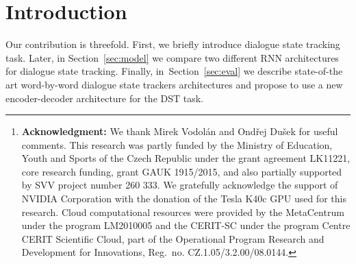 \documentclass{itatnew}
\begin{document}
\begin{abstract}
This paper discusses models for dialogue state tracking using recurrent neural networks (RNN).
We present experiments on the standard dialogue state tracking (DST) dataset, DSTC2~\cite{henderson2014second}.
On the one hand, RNN models became state of the art in DST,
on the other hand, most state-of-the-art models are only turn-based and require dataset-specific preprocessing (e.g. DSTC2-specific) in order to achieve state-of-the-art results.
We implemented two architectures which can be used in incremental settings and require almost no preprocessing.
We compare their performance to the benchmarks on DSTC2 and discuss their properties.
With only trivial preprocessing, the performance of our models is close to the state-of-the-art results.\footnote{
    {\bf Acknowledgment:} We thank Mirek Vodolán and Ondřej Dušek for useful comments.
    This research was partly funded by the Ministry of Education, Youth and Sports of the Czech Republic under the grant agreement LK11221, core research funding, grant GAUK 1915/2015, and also partially supported by SVV project number 260 333. 
    We gratefully acknowledge the support of NVIDIA Corporation with the donation of the Tesla K40c GPU used for this research.
    Cloud computational resources were provided by the MetaCentrum under the program LM2010005 and the CERIT-SC under the program Centre CERIT Scientific Cloud, part of the Operational Program Research and Development for Innovations, Reg.\ no. CZ.1.05/3.2.00/08.0144.}
\end{abstract}

\section{Introduction}
Our contribution is threefold. 
First, we briefly introduce dialogue state tracking task.
Later, in Section~\ref{sec:model} we compare two different RNN architectures for dialogue state tracking.
Finally, in~Section~\ref{sec:eval} we describe state-of-the art word-by-word dialogue state trackers architectures and propose to use a new encoder-decoder architecture for the DST task.
\end{document}
